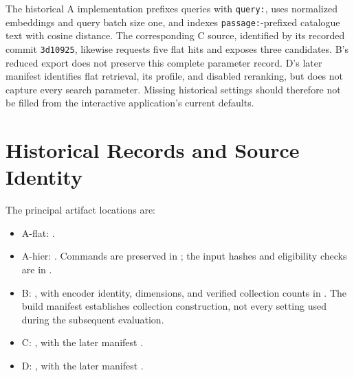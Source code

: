 The historical A implementation prefixes queries with \texttt{query:},
uses normalized embeddings and query batch size one, and indexes
\texttt{passage:}-prefixed catalogue text with cosine distance.
The corresponding C source, identified by its recorded commit
\texttt{3d10925}, likewise requests five flat hits and exposes three
candidates. B's reduced export does not preserve this complete
parameter record. D's later manifest identifies flat retrieval, its
profile, and disabled reranking, but does not capture every search
parameter. Missing historical settings should therefore not be filled
from the interactive application's current defaults.

\section{Historical Records and Source Identity}

The principal artifact locations are:
\begin{itemize}[leftmargin=*]
  \item A-flat:
  .
  \item A-hier:
  .
  Commands are preserved in
  ;
  the input hashes and eligibility checks are in
  .
  \item B:
  ,
  with encoder identity, dimensions, and verified collection counts in
  .
  The build manifest establishes collection construction, not every
  setting used during the subsequent evaluation.
  \item C:
  ,
  with the later manifest
  .
  \item D:
  ,
  with the later manifest
  .
\end{itemize}

